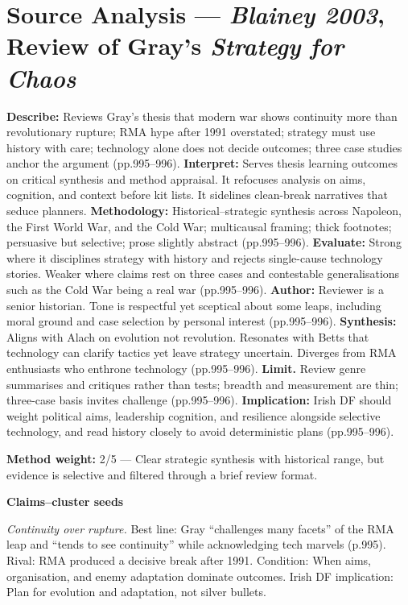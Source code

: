 \section*{Source Analysis — \textit{Blainey 2003}, Review of Gray’s \textit{Strategy for Chaos}}
\textbf{Describe:} Reviews Gray’s thesis that modern war shows continuity more than revolutionary rupture; RMA hype after 1991 overstated; strategy must use history with care; technology alone does not decide outcomes; three case studies anchor the argument (pp.995–996).
\textbf{Interpret:} Serves thesis learning outcomes on critical synthesis and method appraisal. It refocuses analysis on aims, cognition, and context before kit lists. It sidelines clean-break narratives that seduce planners.
\textbf{Methodology:} Historical–strategic synthesis across Napoleon, the First World War, and the Cold War; multicausal framing; thick footnotes; persuasive but selective; prose slightly abstract (pp.995–996).
\textbf{Evaluate:} Strong where it disciplines strategy with history and rejects single-cause technology stories. Weaker where claims rest on three cases and contestable generalisations such as the Cold War being a real war (pp.995–996).
\textbf{Author:} Reviewer is a senior historian. Tone is respectful yet sceptical about some leaps, including moral ground and case selection by personal interest (pp.995–996).
\textbf{Synthesis:} Aligns with Alach on evolution not revolution. Resonates with Betts that technology can clarify tactics yet leave strategy uncertain. Diverges from RMA enthusiasts who enthrone technology (pp.995–996).
\textbf{Limit.} Review genre summarises and critiques rather than tests; breadth and measurement are thin; three-case basis invites challenge (pp.995–996).
\textbf{Implication:} Irish DF should weight political aims, leadership cognition, and resilience alongside selective technology, and read history closely to avoid deterministic plans (pp.995–996).

\textbf{Method weight:} 2/5 — Clear strategic synthesis with historical range, but evidence is selective and filtered through a brief review format.

\textbf{Claims–cluster seeds}

\textit{Continuity over rupture.} Best line: Gray “challenges many facets” of the RMA leap and “tends to see continuity” while acknowledging tech marvels (p.995). Rival: RMA produced a decisive break after 1991. Condition: When aims, organisation, and enemy adaptation dominate outcomes. Irish DF implication: Plan for evolution and adaptation, not silver bullets.

